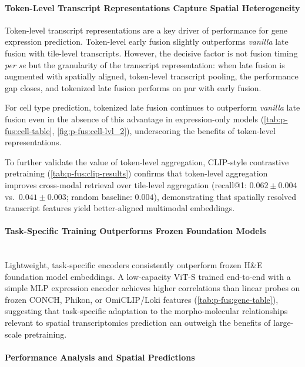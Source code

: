 \paragraph{Token-Level Transcript Representations Capture Spatial Heterogeneity}
\label{par:token-level-transcript-representations-capture-spa}

Token-level transcript representations are a key driver of performance for gene expression prediction. Token-level early fusion slightly outperforms \emph{vanilla} late fusion with tile-level transcripts. However, the decisive factor is not fusion timing \textit{per se} but the granularity of the transcript representation: when late fusion is augmented with spatially aligned, token-level transcript pooling, the performance gap closes, and tokenized late fusion performs on par with early fusion.

For cell type prediction, tokenized late fusion continues to outperform \emph{vanilla} late fusion even in the absence of this advantage in expression-only models (\autoref{tab:p-fus:cell-table}, \autoref{fig:p-fus:cell-lvl_2}), underscoring the benefits of token-level representations.

To further validate the value of token-level aggregation, CLIP-style contrastive pretraining (\autoref{tab:p-fus:clip-results}) confirms that token-level aggregation improves cross-modal retrieval over tile-level aggregation (recall@1: $0.062 \pm 0.004$ vs.\ $0.041 \pm 0.003$; random baseline: $0.004$), demonstrating that spatially resolved transcript features yield better-aligned multimodal embeddings.

\paragraph{Task-Specific Training Outperforms Frozen Foundation Models}
\label{par:task-specific-training-outperforms-frozen-foundati}
\leavevmode\\ Lightweight, task-specific encoders consistently outperform frozen H\&E foundation model embeddings. A low-capacity ViT-S trained end-to-end with a simple MLP expression encoder achieves higher correlations than linear probes on frozen CONCH, Phikon, or OmiCLIP/Loki features (\autoref{tab:p-fus:gene-table}), suggesting that task-specific adaptation to the morpho-molecular relationships relevant to spatial transcriptomics prediction can outweigh the benefits of large-scale pretraining.

\paragraph{Performance Analysis and Spatial Predictions}
\label{par:performance-analysis-and-spatial-predictions}

